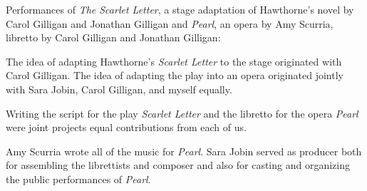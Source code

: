%
%

Performances of \emph{The Scarlet Letter}, a stage adaptation of Hawthorne's novel by Carol Gilligan and Jonathan Gilligan and \emph{Pearl}, an opera by Amy Scurria, libretto by Carol Gilligan and Jonathan Gilligan:
\ifcredit

The idea of adapting Hawthorne's \emph{Scarlet Letter\/} to the stage originated with Carol Gilligan. The idea of adapting the play into an opera originated jointly with Sara Jobin, Carol Gilligan, and myself equally.

Writing the script for the play \emph{Scarlet Letter\/} and the libretto for the opera \emph{Pearl\/} were joint projects equal contributions from each of us.

Amy Scurria wrote all of the music for \emph{Pearl}. Sara Jobin served as producer both for assembling the librettists and composer and also for casting and organizing the public performances of
\emph{Pearl}.
\fi
